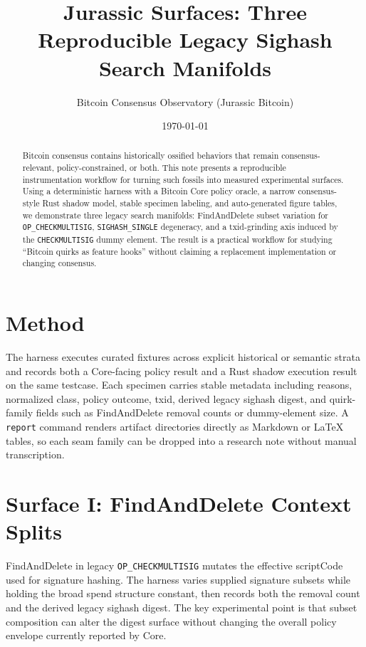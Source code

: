 \documentclass[11pt]{article}
\title{Jurassic Surfaces: Three Reproducible Legacy Sighash Search Manifolds}
\author{Bitcoin Consensus Observatory (Jurassic Bitcoin)}
\date{\today}
\begin{document}
\maketitle

\begin{abstract}
Bitcoin consensus contains historically ossified behaviors that remain consensus-relevant, policy-constrained, or both. This note presents a reproducible instrumentation workflow for turning such fossils into measured experimental surfaces. Using a deterministic harness with a Bitcoin Core policy oracle, a narrow consensus-style Rust shadow model, stable specimen labeling, and auto-generated figure tables, we demonstrate three legacy search manifolds: FindAndDelete subset variation for \texttt{OP\_CHECKMULTISIG}, \texttt{SIGHASH\_SINGLE} degeneracy, and a txid-grinding axis induced by the \texttt{CHECKMULTISIG} dummy element. The result is a practical workflow for studying ``Bitcoin quirks as feature hooks'' without claiming a replacement implementation or changing consensus.
\end{abstract}

\section{Method}

The harness executes curated fixtures across explicit historical or semantic strata and records both a Core-facing policy result and a Rust shadow execution result on the same testcase. Each specimen carries stable metadata including reasons, normalized class, policy outcome, txid, derived legacy sighash digest, and quirk-family fields such as FindAndDelete removal counts or dummy-element size. A \texttt{report} command renders artifact directories directly as Markdown or LaTeX tables, so each seam family can be dropped into a research note without manual transcription.

\section{Surface I: FindAndDelete Context Splits}

FindAndDelete in legacy \texttt{OP\_CHECKMULTISIG} mutates the effective scriptCode used for signature hashing. The harness varies supplied signature subsets while holding the broad spend structure constant, then records both the removal count and the derived legacy sighash digest. The key experimental point is that subset composition can alter the digest surface without changing the overall policy envelope currently reported by Core.
\end{document}
